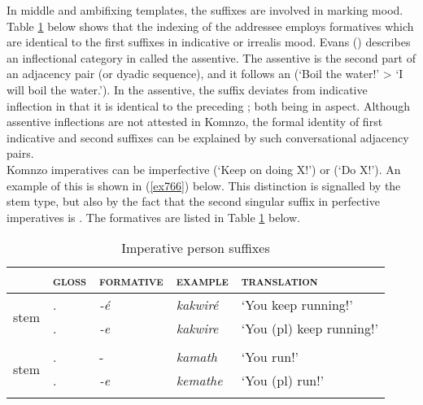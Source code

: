 In middle and ambifixing templates, the  suffixes are involved in marking  mood. Table \ref{perssuffimp} below shows that the indexing of the addressee employs formatives which are identical to the first  suffixes in indicative or irrealis mood. Evans (\citeyear{Evans:2012ue}) describes an inflectional category in  called the assentive. The assentive is the second part of an adjacency pair (or dyadic sequence), and it follows an  (`Boil the water!' > `I will boil the water.'). In the assentive, the  suffix deviates from indicative inflection in that it is identical to the preceding ; both being  in  aspect. Although assentive inflections are not attested in Komnzo, the formal identity of first  indicative and second   suffixes can be explained by such conversational adjacency pairs.\\

Komnzo imperatives can be imperfective (`Keep on doing X!') or  (`Do X!'). An example of this is shown in (\ref{ex766}) below. This distinction is signalled by the stem type, but also by the fact that the second singular suffix in perfective imperatives is . The formatives are listed in Table \ref{perssuffimp} below.

\begin{table}[H]
\caption{Imperative person suffixes}
\label{perssuffimp}
	\begin{tabular}{lllll}
		\lsptoprule
		&\textsc{gloss} &\textsc{formative} &\textsc{example} &\textsc{translation}\\\hline
		\multirow{2}{*}{\Ext{} stem} &\Ssg.\Imp &\emph{-é}	&\emph{kakwiré} &`You keep running!'\\
		&\Snsg.\Imp	&\emph{-e} &\emph{kakwire} &`You (pl) keep running!'\\
		&&&&\\
		\multirow{2}{*}{\Rs{} stem} &\Ssg.\Imp &-\Zero &\emph{kamath} &`You run!'\\
		&\Snsg.\Imp	&\emph{-e} &\emph{kemathe} &`You (pl) run!'\\
		\lspbottomrule
	\end{tabular}
\end{table}%


